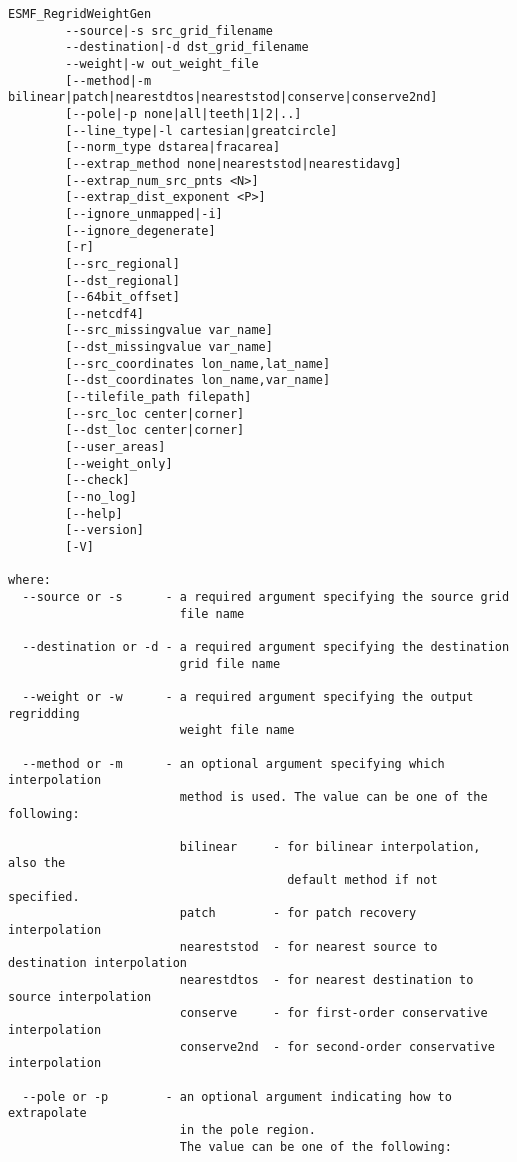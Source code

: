 \begin{verbatim}
ESMF_RegridWeightGen  
        --source|-s src_grid_filename
        --destination|-d dst_grid_filename
        --weight|-w out_weight_file
        [--method|-m bilinear|patch|nearestdtos|neareststod|conserve|conserve2nd]
        [--pole|-p none|all|teeth|1|2|..]
        [--line_type|-l cartesian|greatcircle]
        [--norm_type dstarea|fracarea]
        [--extrap_method none|neareststod|nearestidavg]
        [--extrap_num_src_pnts <N>]
        [--extrap_dist_exponent <P>]
        [--ignore_unmapped|-i]
        [--ignore_degenerate]
        [-r]
        [--src_regional]
        [--dst_regional]
        [--64bit_offset]
        [--netcdf4]
        [--src_missingvalue var_name]
        [--dst_missingvalue var_name]
        [--src_coordinates lon_name,lat_name]
        [--dst_coordinates lon_name,var_name]
        [--tilefile_path filepath]
        [--src_loc center|corner]
        [--dst_loc center|corner]
        [--user_areas]
        [--weight_only]
        [--check]
        [--no_log]
        [--help]
        [--version]
        [-V]

where:
  --source or -s      - a required argument specifying the source grid
                        file name

  --destination or -d - a required argument specifying the destination
                        grid file name

  --weight or -w      - a required argument specifying the output regridding
                        weight file name

  --method or -m      - an optional argument specifying which interpolation
                        method is used. The value can be one of the following:

                        bilinear     - for bilinear interpolation, also the
                                       default method if not specified.
                        patch        - for patch recovery interpolation
                        neareststod  - for nearest source to destination interpolation
                        nearestdtos  - for nearest destination to source interpolation
                        conserve     - for first-order conservative interpolation
                        conserve2nd  - for second-order conservative interpolation

  --pole or -p        - an optional argument indicating how to extrapolate 
                        in the pole region. 
                        The value can be one of the following:


\end{verbatim}
